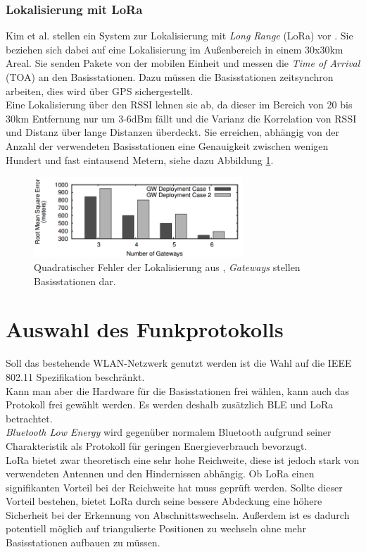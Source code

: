\subsubsection{Lokalisierung mit LoRa}
Kim et al. stellen ein System zur Lokalisierung mit \emph{Long Range} (LoRa) vor \cite{kim2016poster}.
Sie beziehen sich dabei auf eine Lokalisierung im Außenbereich in einem 30x30km Areal. 
Sie senden Pakete von der mobilen Einheit und messen die \emph{Time of Arrival} (TOA) an den Basisstationen.
Dazu müssen die Basisstationen zeitsynchron arbeiten, dies wird über GPS sichergestellt.\\
Eine Lokalisierung über den RSSI lehnen sie ab, da dieser im Bereich von 20 bis 30km Entfernung nur um 3-6dBm fällt und die Varianz die Korrelation von RSSI und Distanz über lange Distanzen überdeckt.
Sie erreichen, abhängig von der Anzahl der verwendeten Basisstationen eine Genauigkeit zwischen wenigen Hundert und fast eintausend Metern, siehe dazu Abbildung \ref{fig:loraacc}.

\begin{figure}[h]
  \centering
	\includegraphics[width=0.7\textwidth]{images/loraacc.png}
  \caption{Quadratischer Fehler der Lokalisierung aus \cite{kim2016poster}, \emph{Gateways} stellen Basisstationen dar.}
  \label{fig:loraacc}
\end{figure}

\section{Auswahl des Funkprotokolls}
Soll das bestehende WLAN-Netzwerk genutzt werden ist die Wahl auf die IEEE 802.11 Spezifikation beschränkt.\\
Kann man aber die Hardware für die Basisstationen frei wählen, kann auch das Protokoll frei gewählt werden.
Es werden deshalb zusätzlich BLE und LoRa betrachtet.\\
\emph{Bluetooth Low Energy} wird gegenüber normalem Bluetooth aufgrund seiner Charakteristik als Protokoll für geringen Energieverbrauch bevorzugt.\\
LoRa bietet zwar theoretisch eine sehr hohe Reichweite, diese ist jedoch stark von verwendeten Antennen und den Hindernissen abhängig.
Ob LoRa einen signifikanten Vorteil bei der Reichweite hat muss geprüft werden.
Sollte dieser Vorteil bestehen, bietet LoRa durch seine bessere Abdeckung eine höhere Sicherheit bei der Erkennung von Abschnittswechseln. 
Außerdem ist es dadurch potentiell möglich auf triangulierte Positionen zu wechseln ohne mehr Basisstationen aufbauen zu müssen.


